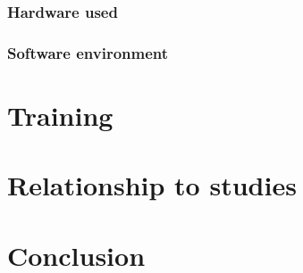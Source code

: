 \documentclass{article}
\begin{document}
\subsubsection{Hardware used}

\subsubsection{Software environment}


\section{Training}

\section{Relationship to studies}

\section{Conclusion}
\end{document}
